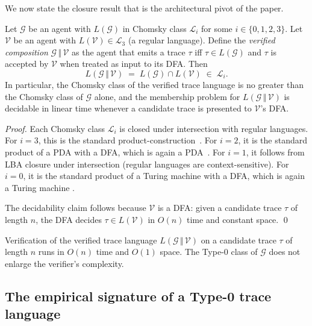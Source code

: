 We now state the closure result that is the architectural pivot
of the paper.

\begin{theorem}
\label{thm:closure}
Let $\mathcal{G}$ be an agent with $L(\mathcal{G})$ in Chomsky
class $\mathcal{L}_i$ for some $i\in\{0,1,2,3\}$.  Let
$\mathcal{V}$ be an agent with $L(\mathcal{V}) \in \mathcal{L}_3$
(a regular language).  Define the \emph{verified composition}
$\mathcal{G}\,\Vert\,\mathcal{V}$ as the agent that emits a
trace $\tau$ iff $\tau \in L(\mathcal{G})$ and $\tau$ is accepted
by $\mathcal{V}$ when treated as input to its DFA.  Then
\[
L(\mathcal{G}\,\Vert\,\mathcal{V})
\;=\; L(\mathcal{G}) \cap L(\mathcal{V})
\;\in\; \mathcal{L}_i.
\]
In particular, the Chomsky class of the verified trace language
is no greater than the Chomsky class of $\mathcal{G}$ alone, and
the membership problem for $L(\mathcal{G}\,\Vert\,\mathcal{V})$
is decidable in linear time whenever a candidate trace is
presented to $\mathcal{V}$'s DFA.
\end{theorem}

\begin{proof}
Each Chomsky class $\mathcal{L}_i$ is closed under intersection
with regular languages.  For $i = 3$, this is the standard
product-construction~\cite{rabin1959finite}.  For $i = 2$, it is
the standard product of a PDA with a DFA, which is again a
PDA~\cite{hopcroft2006automata}.  For $i = 1$, it follows from
LBA closure under intersection (regular languages are
context-sensitive).  For $i = 0$, it is the standard product
of a Turing machine with a DFA, which is again a Turing machine
\cite{turing1936computable,hopcroft2006automata}.

The decidability claim follows because $\mathcal{V}$ is a DFA:
given a candidate trace $\tau$ of length $n$, the DFA decides
$\tau \in L(\mathcal{V})$ in $O(n)$ time and constant space.
\qed
\end{proof}

\begin{corollary}
\label{cor:budget}
Verification of the verified trace language
$L(\mathcal{G}\,\Vert\,\mathcal{V})$ on a candidate trace $\tau$
of length $n$ runs in $O(n)$ time and $O(1)$ space.  The Type-0
class of $\mathcal{G}$ does not enlarge the verifier's complexity.
\end{corollary}

\subsection{The empirical signature of a Type-0 trace language}

